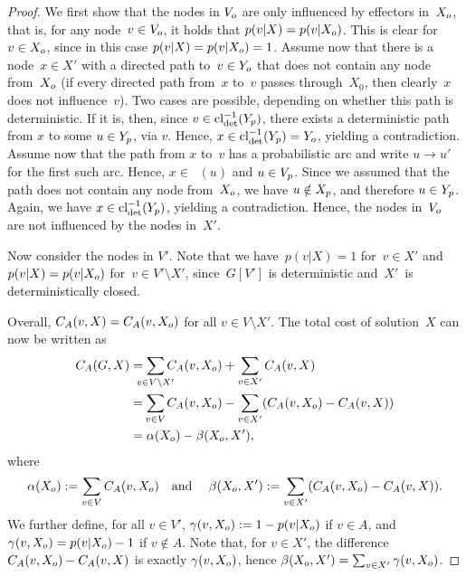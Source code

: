 \documentclass{article}
\DeclareMathOperator{\idcl}{\ensuremath{cl_{det}^{-1}}}
\begin{document}
\begin{proof}
  We first show that the nodes in $V_{o}$ are only influenced by effectors in~$X_{o}$, that is, for any node~$v\in V_{o}$, it holds that
  $p(v|X)=p(v|X_{o})$. This is clear for $v\in X_{o}$, since in this case $p(v|X)=p(v|X_{o})=1$.
  Assume now that there is a node~$x\in X'$ with a directed path to~$v\in Y_{o}$ 
	that does not contain  any node from~$X_{o}$ (if every directed path from~$x$ to~$v$ passes through~$X_0$, then clearly~$x$ does not influence~$v$). 
	Two cases are possible, depending on whether this path is deterministic.
	If it is, then, since $v\in\idcl(\Yp)$, there exists a deterministic path from $x$ to some $u\in Y_p$, via $v$.
	Hence, $x\in \idcl(\Yp)=\Yplus$, yielding a contradiction.
	Assume now that the path from $x$ to~$v$ has a probabilistic arc and write $u\to u'$ for the first such arc. Hence, $x\in \idcl(u)$ and $u\in V_p$. Since we assumed that the path does not contain any node from~$X_{o}$, we have $u\notin X_p$, and therefore $u\in Y_p$. Again, we have $x\in \idcl(\Yp)$, yielding a contradiction. 
        Hence, the nodes in~$V_{o}$ are not influenced by the
        nodes in~$X'$.
        
   Now consider the nodes in $V'$. Note that we have~$p(v|X)=1$ for~$v\in X'$ and $p(v|X) = p(v|X_{o})$
  for~$v\in V'\setminus X'$, since~$G[V']$ is deterministic and~$X'$~is
  deterministically closed.
   \iffalse
  Thus, we can write the cost~$C_A(G,X)$ as  
  \begin{align*}
    C_A(G,X) &= \smashoperator{\sum_{v\in \Vplus}}C_A(v,X) + \sum_{v\in
      V'}C_A(v,X)\\
    &= \smashoperator{\sum_{v\in \Vplus\cap A}}(1-p(v|\Xplus))+\smashoperator{\sum_{v\in \Vplus\setminus A}}p(v|\Xplus)
    + \smashoperator{\sum_{v\in V'\cap A}}(1-p(v|X)) + \smashoperator{\sum_{v\in V'\setminus A}}p(v|X).
  \end{align*}
\fi
    Overall, $C_A(v,X)=C_A(v,X_{o} )$ for all $v\in V\setminus X'$. The total cost of solution~$X$ can now be written as
  \begin{align*}
    C_A(G,X) &= \smashoperator{\sum_{v\in V\setminus X'}}C_A(v,\Xplus)
      + \sum_{v\in X'}C_A(v,X) \\
      &= \smashoperator{\sum_{v\in V}}C_A(v,\Xplus)
      - \sum_{v\in X'}(C_A(v,\Xplus)-C_A(v,X)) \\
       &= \alpha(\Xplus)-\beta(\Xplus,X'),
  \end{align*}
where
  \[
   \alpha(X_{o}):=\sum_{v\in V}C_A(v,X_{o}) \text{\quad and \quad} \beta(X_{o},X'):= \sum_{v\in X'}(C_A(v,X_{o})-C_A(v,X)).
  \]
  We further define, for all $v\in V'$,
  $\gamma(v,X_{o}):=1-p(v|X_{o})$ if $v\in A$, and
  $\gamma(v,X_{o})=p(v|X_{o})-1$ if $v\notin A$.
  Note that, for $v\in X'$, the
  difference~$C_A(v,X_{o})-C_A(v,X)$
  is exactly $\gamma(v,X_{o})$, hence $\beta(X_{o},X')= \sum_{v\in X'}\gamma(v,X_{o})$.
 

\end{proof}
\end{document}

